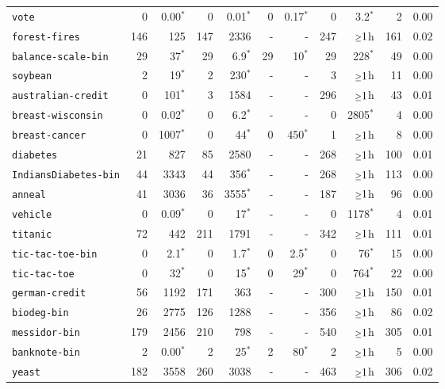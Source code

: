 \begin{tabular}{lrrrrrrrrrr}
\texttt{vote} & 0 & 0.00$^*$ & 0 & 0.01$^*$ & 0 & 0.17$^*$ & 0 & 3.2$^*$ & 2 & 0.00\\
\texttt{forest-fires} & 146 & 125 & 147 & 2336 & - & - & 247 & $\mathsmaller{\geq}1$h & 161 & 0.02\\
\texttt{balance-scale-bin} & 29 & 37$^*$ & 29 & 6.9$^*$ & 29 & 10$^*$ & 29 & 228$^*$ & 49 & 0.00\\
\texttt{soybean} & 2 & 19$^*$ & 2 & 230$^*$ & - & - & 3 & $\mathsmaller{\geq}1$h & 11 & 0.00\\
\texttt{australian-credit} & 0 & 101$^*$ & 3 & 1584 & - & - & 296 & $\mathsmaller{\geq}1$h & 43 & 0.01\\
\texttt{breast-wisconsin} & 0 & 0.02$^*$ & 0 & 6.2$^*$ & - & - & 0 & 2805$^*$ & 4 & 0.00\\
\texttt{breast-cancer} & 0 & 1007$^*$ & 0 & 44$^*$ & 0 & 450$^*$ & 1 & $\mathsmaller{\geq}1$h & 8 & 0.00\\
\texttt{diabetes} & 21 & 827 & 85 & 2580 & - & - & 268 & $\mathsmaller{\geq}1$h & 100 & 0.01\\
\texttt{IndiansDiabetes-bin} & 44 & 3343 & 44 & 356$^*$ & - & - & 268 & $\mathsmaller{\geq}1$h & 113 & 0.00\\
\texttt{anneal} & 41 & 3036 & 36 & 3555$^*$ & - & - & 187 & $\mathsmaller{\geq}1$h & 96 & 0.00\\
\texttt{vehicle} & 0 & 0.09$^*$ & 0 & 17$^*$ & - & - & 0 & 1178$^*$ & 4 & 0.01\\
\texttt{titanic} & 72 & 442 & 211 & 1791 & - & - & 342 & $\mathsmaller{\geq}1$h & 111 & 0.01\\
\texttt{tic-tac-toe-bin} & 0 & 2.1$^*$ & 0 & 1.7$^*$ & 0 & 2.5$^*$ & 0 & 76$^*$ & 15 & 0.00\\
\texttt{tic-tac-toe} & 0 & 32$^*$ & 0 & 15$^*$ & 0 & 29$^*$ & 0 & 764$^*$ & 22 & 0.00\\
\texttt{german-credit} & 56 & 1192 & 171 & 363 & - & - & 300 & $\mathsmaller{\geq}1$h & 150 & 0.01\\
\texttt{biodeg-bin} & 26 & 2775 & 126 & 1288 & - & - & 356 & $\mathsmaller{\geq}1$h & 86 & 0.02\\
\texttt{messidor-bin} & 179 & 2456 & 210 & 798 & - & - & 540 & $\mathsmaller{\geq}1$h & 305 & 0.01\\
\texttt{banknote-bin} & 2 & 0.00$^*$ & 2 & 25$^*$ & 2 & 80$^*$ & 2 & $\mathsmaller{\geq}1$h & 5 & 0.00\\
\texttt{yeast} & 182 & 3558 & 260 & 3038 & - & - & 463 & $\mathsmaller{\geq}1$h & 306 & 0.02\\

\end{tabular}

